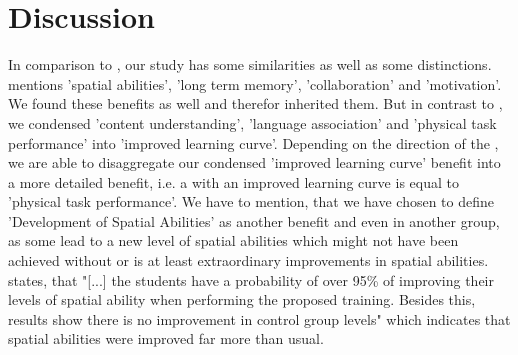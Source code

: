 \section{Discussion}
\label{sec:Discussion}
In comparison to \cite{Radu.2014}, our study has some similarities as well as some distinctions. \cite{Radu.2014} mentions 'spatial abilities', 'long term memory', 'collaboration' and 'motivation'. We found these benefits as well and therefor inherited them. But in contrast to \cite{Radu.2014}, we condensed 'content understanding', 'language association' and 'physical task performance' into 'improved learning curve'. Depending on the direction of the \appns, we are able to disaggregate our condensed 'improved learning curve' benefit into a more detailed benefit, i.e. a \ST \app with an improved learning curve is equal to 'physical task performance'. We have to mention, that we have chosen to define 'Development of Spatial Abilities' as another benefit and even in another group, as some \apps lead to a new level of spatial abilities which might not have been achieved without \AR or is at least extraordinary improvements in spatial abilities. \cite{MartinGutierrez.2013} states, that "[...] the students have a probability of over 95\% of improving their levels of spatial ability when performing the proposed training. Besides this, results show there is no improvement in control group levels"\autocite[4]{MartinGutierrez.2013} which indicates that spatial abilities were improved far more than usual. \\

